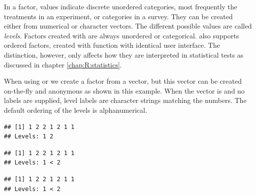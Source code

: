 \documentclass[krantz2]{krantz}\usepackage{knitr}
\begin{document}
In a factor, values indicate discrete unordered categories, most frequently the treatments in an experiment, or categories in a survey. They can be created either from numerical or character vectors. The different possible values are called \emph{levels}. Factors created with  are always unordered or categorical. \Rlang also supports ordered factors, created with function  with identical user interface. The distinction, however, only affects how they are interpreted in statistical tests as discussed in chapter \ref{chap:R:statistics}. 

When using  or  we create a factor from a vector, but this vector can be created on-the-fly and anonymous as shown in this example. When the vector is  and no labels are supplied, level labels are character strings matching the numbers. The default ordering of the levels is alphanumerical.

\begin{knitrout}\footnotesize
{}\color{fgcolor}\begin{kframe}
\begin{alltt}
\hlstd{(} \hlstd{=} \hlstd{(}\hlstd{,} \hlstd{,} \hlstd{,} \hlstd{,} \hlstd{,} \hlstd{,} \hlstd{))}
\end{alltt}
\begin{verbatim}
## [1] 1 2 2 1 2 1 1
## Levels: 1 2
\end{verbatim}
\begin{alltt}
\hlstd{(} \hlstd{=} \hlstd{(}\hlstd{,} \hlstd{,} \hlstd{,} \hlstd{,} \hlstd{,} \hlstd{,} \hlstd{))}
\end{alltt}
\begin{verbatim}
## [1] 1 2 2 1 2 1 1
## Levels: 1 < 2
\end{verbatim}
\begin{alltt}
\hlstd{(} \hlstd{=} \hlstd{(}\hlstd{,} \hlstd{,} \hlstd{,} \hlstd{,} \hlstd{,} \hlstd{,} \hlstd{),}  \hlstd{=} \hlstd{)}
\end{alltt}
\begin{verbatim}
## [1] 1 2 2 1 2 1 1
## Levels: 1 < 2
\end{verbatim}
\end{kframe}
\end{knitrout}
\end{document}
